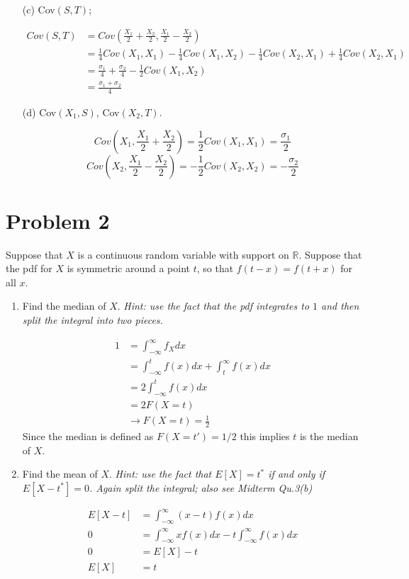 \documentclass{article}
\newcommand{\1}{\mathbf{1}}
\begin{document}
\begin{enumerate}
    \item[(c)] Cov$(S,T)$;

    \begin{align*}
        Cov(S, T) &= Cov\left(\frac{X_1}{2}+\frac{X_2}{2}, \frac{X_1}{2}-\frac{X_2}{2} \right) \\
        &= \frac{1}{4} Cov(X_1, X_1) - \frac{1}{4} Cov(X_1, X_2) - \frac{1}{4}Cov(X_2, X_1) + \frac{1}{4} Cov(X_2, X_1)\\
        &= \frac{\sigma_1}{4} + \frac{\sigma_2}{4} - \frac{1}{2}Cov(X_1, X_2) \\
        &= \frac{\sigma_1 + \sigma_2}{4}
    \end{align*}

    \item[(d)] Cov$(X_1,S)$, Cov$(X_2,T)$.
    
    $$Cov\left(X_1, \frac{X_1}{2}+\frac{X_2}{2}\right) = \frac{1}{2} Cov(X_1, X_1) =  \frac{\sigma_1}{2} $$
    $$Cov\left(X_2, \frac{X_1}{2}-\frac{X_2}{2}\right) = -\frac{1}{2} Cov(X_2, X_2) =  -\frac{\sigma_2}{2} $$
\end{enumerate}



\newpage
\section*{Problem 2}
Suppose that $X$ is a continuous random variable with support on $\mathbb{R}$. Suppose that the pdf for $X$ is symmetric around a point $t$, so that $f(t-x) = f(t+x)$ for all $x$.
\begin{enumerate}
    \item Find the median of $X$. {\it Hint: use the fact that the pdf integrates to $1$ and then split the integral into two pieces.}
    
    \begin{align*}
        1 &= \int_{-\infty}^\infty f_X dx \\
        &= \int_{-\infty}^t f(x)dx + \int_t^\infty f(x)dx \\
        &= 2\int_{-\infty}^t f(x)dx  \\
        &= 2F(X=t) \\
        &\rightarrow F(X=t) = \frac{1}{2}
    \end{align*}
    Since the median is defined as $F(X=t')=1/2$ this implies $t$ is the median of $X$.
    
    \item Find the mean of $X$. {\it Hint: use the fact that $E[X] = t^*$ if and only if $E[X-t^*]=0$. Again split the integral; also see Midterm Qu.3(b)} 
    
    \begin{align*}
        E[X-t] &= \int_{-\infty}^\infty (x-t) f(x) dx \\
        0 &= \int_{-\infty}^\infty x f(x) dx - t \int_{-\infty}^\infty f(x) dx \\
        0 &= E[X] - t \\
        E[X] &=  t
    \end{align*}
    
\end{enumerate}
\end{document}
